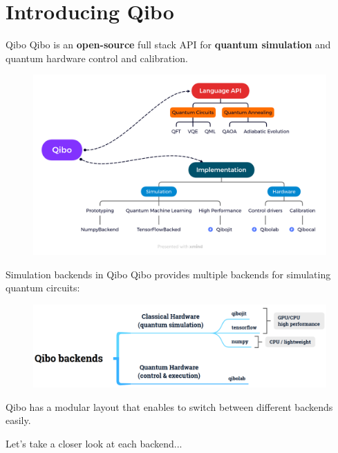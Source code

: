 \documentclass[11p,aspectratio=169]{beamer}
\begin{document}

\section{Introducing Qibo}

\begin{frame}{Qibo}
    Qibo is an \textbf{open-source} full stack API for \textbf{quantum simulation} and quantum hardware control and calibration.
    \begin{figure}
        \includegraphics[width= \textwidth]{figures/Qibo.png}
    \end{figure}
    
\end{frame}


\begin{frame}{Simulation backends in Qibo}
    Qibo provides multiple backends for
    simulating quantum circuits:

    \begin{figure}
        \includegraphics[width = \textwidth]{figures/backends.png}
    \end{figure}

    Qibo has a modular layout that enables to switch between different backends easily.

    Let's take a closer look at each backend...
\end{frame}
\end{document}
